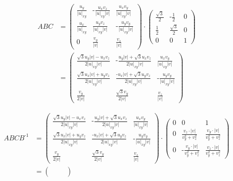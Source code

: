 \documentclass[a4paper]{scrartcl}
\begin{document}
\begin{align*}
ABC & = 
\begin{pmatrix} 
\frac{u_y}{\left|u\right|_{xy}} & \text{-} \frac{u_x v_z}{\left|u\right|_{xy}\left|v\right|} & \frac{u_x v_y}{\left|u\right|_{xy}\left|v\right|} \\
\frac{u_x}{\left|u\right|_{xy}} & \frac{u_y v_z}{\left|u\right|_{xy}\left|v\right|} & \text{-} \frac{u_y v_y}{\left|u\right|_{xy}\left|v\right|} \\ 
0 & \frac{v_y}{\left|v\right|} & \frac{v_z}{\left|v\right|} 
\end{pmatrix}
\cdot
\begin{pmatrix} \frac{\sqrt{3}}{2} & \text{-}\frac{1}{2} & 0 \\ \frac{1}{2} & \frac{\sqrt{3}}{2} & 0 \\ 0 & 0 & 1\end{pmatrix}
\\ & =
\begin{pmatrix} 
\frac{\sqrt{3} u_y \left|v\right| - u_x v_z}{2 \left|u\right|_{xy}\left|v\right|} & 
\text{-}\frac{ u_y \left|v\right| + \sqrt{3} u_x v_z}{2 \left|u\right|_{xy}\left|v\right|} &  
\frac{u_x v_y}{\left|u\right|_{xy}\left|v\right|}
\\
\frac{\sqrt{3} u_x \left|v\right| + u_y v_z}{2 \left|u\right|_{xy}\left|v\right|} &
\frac{\text{-} u_x \left|v\right| + \sqrt{3} u_y v_z}{2 \left|u\right|_{xy}\left|v\right|} & 
\text{-} \frac{u_y v_y}{\left|u\right|_{xy}\left|v\right|}
\\
\frac{v_y}{2 \left|v\right|} &
\frac{\sqrt{3} v_y}{2 \left|v\right|} &
\frac{v_z}{\left|v\right|} 
\end{pmatrix}
\end{align*}


\begin{align*}
ABCB^{\text{-}1} & =
\begin{pmatrix} 
\frac{\sqrt{3} u_y \left|v\right| - u_x v_z}{2 \left|u\right|_{xy}\left|v\right|} & 
\text{-}\frac{ u_y \left|v\right| + \sqrt{3} u_x v_z}{2 \left|u\right|_{xy}\left|v\right|} &  
\frac{u_x v_y}{\left|u\right|_{xy}\left|v\right|}
\\
\frac{\sqrt{3} u_x \left|v\right| + u_y v_z}{2 \left|u\right|_{xy}\left|v\right|} &
\frac{\text{-} u_x \left|v\right| + \sqrt{3} u_y v_z}{2 \left|u\right|_{xy}\left|v\right|} & 
\text{-} \frac{u_y v_y}{\left|u\right|_{xy}\left|v\right|}
\\
\frac{v_y}{2 \left|v\right|} &
\frac{\sqrt{3} v_y}{2 \left|v\right|} &
\frac{v_z}{\left|v\right|} 
\end{pmatrix}
\cdot
\begin{pmatrix}
0 & 0 & 1 \\
0 & \frac{v_z \cdot \left|v\right|}{v_y^2 + v_z^2} & \frac{v_y \cdot \left|v\right|}{v_y^2 + v_z^2}\\
0 & \text{-}\frac{v_y \cdot \left|v\right|}{v_y^2 + v_z^2} & \frac{v_z \cdot \left|v\right|}{v_y^2 + v_z^2}
\end{pmatrix}
\\ & =
\begin{pmatrix}
&
&
\\
&
&
\\
&
&
\end{pmatrix}
\end{align*}
\end{document}
